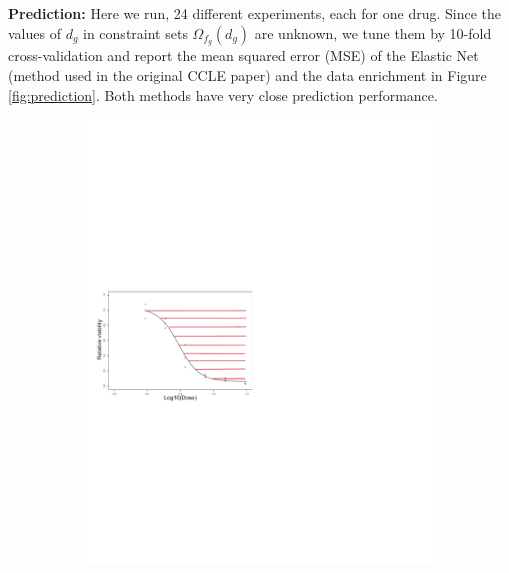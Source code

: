 {\bf Prediction:} Here we run, 24 different experiments, each for one drug.  %
Since the values of $d_g$  in constraint sets $\Omega_{f_g}(d_g)$  are unknown, we tune them by 10-fold cross-validation and report the mean squared error (MSE) of the Elastic Net \cite{zoha05} (method used in the original CCLE paper\cite{barretina2012cancer}) and the data enrichment in Figure \ref{fig:prediction}. Both methods have very close prediction performance.
	\begin{figure}[t]
	\begin{subfigure}[b]{0.32\textwidth}
		\includegraphics[width=\textwidth]{./img/dr4.pdf}
		\caption{}\label{fig:dr}
	\end{subfigure} ~
	\begin{subfigure}[b]{0.30\textwidth}

\end{subfigure}
\end{figure}
